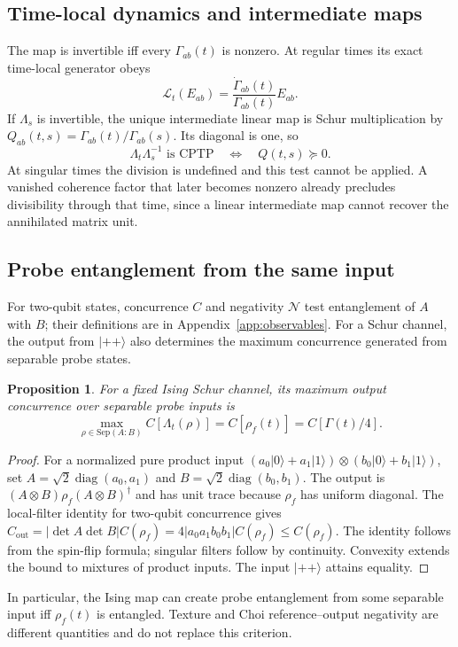 \documentclass[11pt,a4paper]{article}
\newcommand{\ket}[1]{\lvert #1\rangle}
\newcommand{\diag}{\operatorname{diag}}
\newtheorem{proposition}{Proposition}[section]
\begin{document}
\subsection{Time-local dynamics and intermediate maps}

The map is invertible iff every $\Gamma_{ab}(t)$ is nonzero. At regular
times its exact time-local generator obeys
\begin{equation}
 \mathcal L_t(E_{ab})=\frac{\dot\Gamma_{ab}(t)}{\Gamma_{ab}(t)}E_{ab}.
\end{equation}
If $\Lambda_s$ is invertible, the unique intermediate linear map is
Schur multiplication by $Q_{ab}(t,s)=\Gamma_{ab}(t)/\Gamma_{ab}(s)$.
Its diagonal is one, so
\begin{equation}
 \Lambda_t\Lambda_s^{-1}\text{ is CPTP}\quad\Longleftrightarrow\quad
 Q(t,s)\succeq0.
 \label{eq:divisibility}
\end{equation}
At singular times the division is undefined and this test cannot be
applied. A vanished coherence factor that later becomes nonzero already
precludes divisibility through that time, since a linear intermediate
map cannot recover the annihilated matrix unit.

\subsection{Probe entanglement from the same input}
\label{sec:entangling}

For two-qubit states, concurrence $C$ and negativity $\mathcal N$ test
entanglement of $A$ with $B$; their definitions are in
Appendix~\ref{app:observables}. For a Schur channel, the output from
$\ket{++}$ also determines the maximum concurrence generated from
separable probe states.

\begin{proposition}
For a fixed Ising Schur channel, its maximum output concurrence over
separable probe inputs is
\begin{equation}
 \max_{\rho\in\mathrm{Sep}(A:B)}C[\Lambda_t(\rho)]
 =C[\rho_f(t)]=C[\Gamma(t)/4].
 \label{eq:cgen}
\end{equation}
\end{proposition}
\begin{proof}
For a normalized pure product input
$(a_0\ket0+a_1\ket1)\otimes(b_0\ket0+b_1\ket1)$, set
$A=\sqrt2\diag(a_0,a_1)$ and $B=\sqrt2\diag(b_0,b_1)$.
The output is $(A\otimes B)\rho_f(A\otimes B)^\dagger$ and has unit
trace because $\rho_f$ has uniform diagonal. The local-filter identity
for two-qubit concurrence gives
$C_{\mathrm{out}}=|\det A\det B|C(\rho_f)
=4|a_0a_1b_0b_1|C(\rho_f)\le C(\rho_f)$.
The identity follows from the spin-flip formula; singular filters follow
by continuity. Convexity extends the bound to mixtures of product
inputs. The input $\ket{++}$ attains equality.
\end{proof}
In particular, the Ising map can create probe entanglement from some
separable input iff $\rho_f(t)$ is entangled. Texture and Choi
reference--output negativity are different quantities and do not replace
this criterion.
\end{document}

